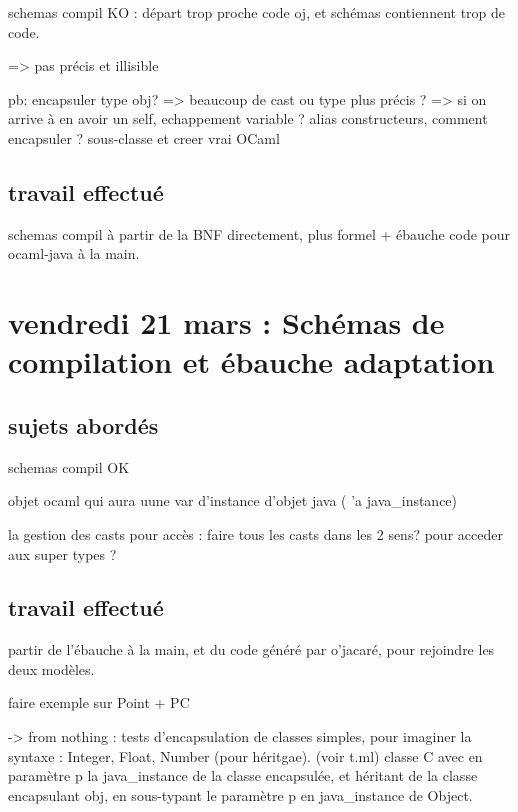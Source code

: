 \documentclass[a4paper, 11pt]{report}
\begin{document}
schemas compil KO : départ trop proche code oj, et schémas contiennent
trop de code.

=> pas précis et illisible

pb: encapsuler type obj? => beaucoup de cast
    ou type plus précis ? => si on arrive à en avoir un
self, echappement variable ?
alias constructeurs, comment encapsuler ?
sous-classe et creer vrai OCaml

\subsection{travail effectué}

schemas compil à partir de la BNF directement, plus formel
+ ébauche code pour ocaml-java à la main.





\section{vendredi 21 mars : Schémas de compilation et ébauche adaptation}
\subsection{sujets abordés}

schemas compil OK

objet ocaml qui aura uune var d'instance d'objet java ( 'a
java\_instance)

la gestion des casts pour accès : faire tous les casts dans les 2 sens?
pour acceder aux super types ?

\subsection{travail effectué}

partir de l'ébauche à la main, et du code généré par o'jacaré, pour
rejoindre les deux modèles.

faire exemple sur Point + PC

-> from nothing : tests d'encapsulation de classes simples, pour
imaginer la syntaxe : Integer, Float, Number (pour héritgae). 
(voir t.ml) 
classe C avec en paramètre p la java_instance de la classe encapsulée, 
et héritant de la classe encapsulant obj, en sous-typant le paramètre
p en java_instance de Object.
\end{document}
